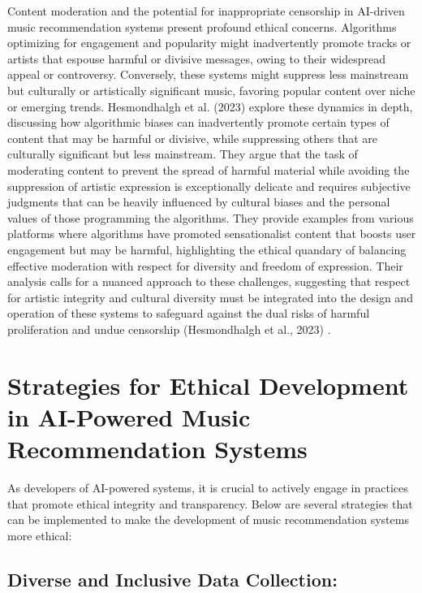 \documentclass[10pt,twocolumn]{article}
\begin{document}
Content moderation and the potential for inappropriate censorship in AI-driven music recommendation systems present profound ethical concerns. Algorithms optimizing for engagement and popularity might inadvertently promote tracks or artists that espouse harmful or divisive messages, owing to their widespread appeal or controversy. Conversely, these systems might suppress less mainstream but culturally or artistically significant music, favoring popular content over niche or emerging trends. Hesmondhalgh et al. (2023) \cite{hesmondhalgh2023impact} explore these dynamics in depth, discussing how algorithmic biases can inadvertently promote certain types of content that may be harmful or divisive, while suppressing others that are culturally significant but less mainstream. They argue that the task of moderating content to prevent the spread of harmful material while avoiding the suppression of artistic expression is exceptionally delicate and requires subjective judgments that can be heavily influenced by cultural biases and the personal values of those programming the algorithms. They provide examples from various platforms where algorithms have promoted sensationalist content that boosts user engagement but may be harmful, highlighting the ethical quandary of balancing effective moderation with respect for diversity and freedom of expression. Their analysis calls for a nuanced approach to these challenges, suggesting that respect for artistic integrity and cultural diversity must be integrated into the design and operation of these systems to safeguard against the dual risks of harmful proliferation and undue censorship (Hesmondhalgh et al., 2023) \cite{hesmondhalgh2023impact}.



\section{Strategies for Ethical Development in AI-Powered Music Recommendation Systems}


As developers of AI-powered systems, it is crucial to actively engage in practices that promote ethical integrity and transparency. Below are several strategies that can be implemented to make the development of music recommendation systems more ethical:


\subsection{Diverse and Inclusive Data Collection: }
\end{document}
